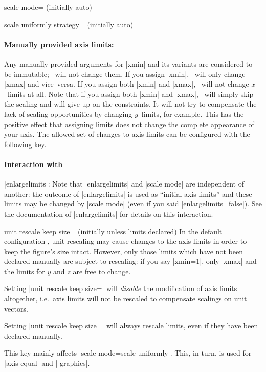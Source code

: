 \begin{pgfplotskey}{scale mode= (initially auto)}
\begin{pgfplotskey}{scale uniformly strategy= (initially auto)}
	\end{pgfplotskey}

	\paragraph{Manually provided axis limits:} Any manually provided arguments for |xmin| and its variants are considered to be immutable; \PGFPlots\ will not change them. If you assign |xmin|, \PGFPlots\ will only change |xmax| and vice--versa. If you assign both |xmin| and |xmax|, \PGFPlots\ will not change $x$~limits at all. Note that if you assign both |xmin| and |xmax|, \PGFPlots\ will simply skip the scaling and will give up on the constraints. It will not try to compensate the lack of scaling opportunities by changing $y$~limits, for example. This has the positive effect that assigning limits does not change the complete appearance of your axis.  The allowed set of changes to axis limits can be configured with the following key.

	\paragraph{Interaction with }|enlargelimits|: Note that |enlargelimits| and |scale mode| are independent of another: the outcome of |enlargelimits| is used as ``initial axis limits'' and these limits may be changed by |scale mode| (even if you said |enlargelimits=false|). See the documentation of |enlargelimits| for details on this interaction.

	\begin{pgfplotskey}{
		unit rescale keep size= (initially unless limits declared)}
		In the default configuration , unit rescaling may cause changes to the axis limits in order to keep the figure's size intact. However, only those limits which have not been declared manually are subject to rescaling: if you say |xmin=1|, only |xmax| and the limits for $y$ and $z$ are free to change.

		Setting |unit rescale keep size=| will \emph{disable} the modification of axis limits altogether, i.e.\ axis limits will not be rescaled to compensate scalings on unit vectors.

		Setting |unit rescale keep size=| will always rescale limits, even if they have been declared manually.
		
		This key mainly affects |scale mode=scale uniformly|. This, in turn, is used for |axis equal| and | graphics|.


\end{pgfplotskey}
\end{pgfplotskey}
